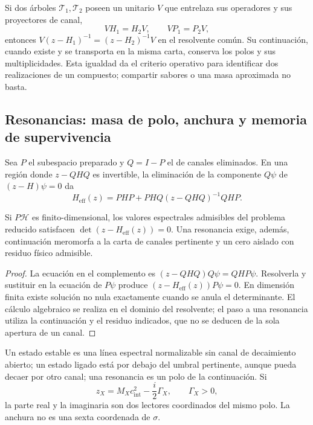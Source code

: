 Si dos árboles \(\mathcal T_1,\mathcal T_2\) poseen un unitario
\(V\) que entrelaza sus operadores y sus proyectores de canal,
\[
 VH_1=H_2V,\qquad VP_1=P_2V,
\]
entonces \(V(z-H_1)^{-1}=(z-H_2)^{-1}V\) en el resolvente común.
Su continuación, cuando existe y se transporta en la misma carta,
conserva los polos y sus multiplicidades. Esta igualdad da el criterio
operativo para identificar dos realizaciones de un compuesto; compartir
sabores o una masa aproximada no basta.

\subsection{Resonancias: masa de polo, anchura y memoria de supervivencia}
\label{vi:vi:subsec:resonancias-familias}

Sea \(P\) el subespacio preparado y \(Q=I-P\) el de canales
eliminados. En una región donde \(z-QHQ\) es invertible, la eliminación
de la componente \(Q\psi\) de \((z-H)\psi=0\) da
\begin{equation}
 H_{\mathrm{eff}}(z)=PHP+PHQ(z-QHQ)^{-1}QHP.
 \label{vi:vi:eq:feshbach-familias}
\end{equation}

\begin{proposition}
\label{vi:vi:prop:feshbach-familias}
Si \(P\mathcal H\) es finito-dimensional, los valores espectrales
admisibles del problema reducido satisfacen
\(\det(z-H_{\mathrm{eff}}(z))=0\). Una resonancia exige, además,
continuación meromorfa a la carta de canales pertinente y un cero
aislado con residuo físico admisible.
\end{proposition}
\begin{proof}
La ecuación en el complemento es
\((z-QHQ)Q\psi=QHP\psi\). Resolverla y sustituir en la ecuación
de \(P\psi\) produce \((z-H_{\mathrm{eff}}(z))P\psi=0\).
En dimensión finita existe solución no nula exactamente cuando se
anula el determinante. El cálculo algebraico se realiza en el dominio
del resolvente; el paso a una resonancia utiliza la continuación y el
residuo indicados, que no se deducen de la sola apertura de un canal.
\end{proof}

Un estado estable es una línea espectral normalizable sin canal de
decaimiento abierto; un estado ligado está por debajo del umbral
pertinente, aunque pueda decaer por otro canal; una resonancia es un
polo de la continuación. Si
\[
 z_X=M_Xc_{\mathrm{int}}^2-\frac{i}{2}\Gamma_X,
 \qquad\Gamma_X>0,
\]
la parte real y la imaginaria son dos lectores coordinados del mismo
polo. La anchura no es una sexta coordenada de \(\sigma\).

